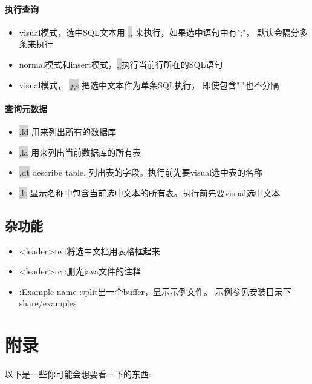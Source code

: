 \documentclass[oneside,openany]{book}
\begin{document}
\subsubsection{执行查询}

    \begin{itemize} 
      \item  visual模式，选中SQL文本用 \colorbox{lightgray}{,,} 来执行，如果选中语句中有";"， 默认会隔分多条来执行
      \item  normal模式和insert模式，\colorbox{lightgray}{,,}执行当前行所在的SQL语句
      \item  visual模式， \colorbox{lightgray}{,gs} 把选中文本作为单条SQL执行， 即使包含";"也不分隔
    \end{itemize} 

\subsubsection{查询元数据}

    \begin{itemize} 
    \item \colorbox{lightgray}{,ld} 用来列出所有的数据库
    \item \colorbox{lightgray}{,la} 用来列出当前数据库的所有表
    \item \colorbox{lightgray}{,dt} describe table, 列出表的字段。执行前先要visual选中表的名称
    \item \colorbox{lightgray}{,lt} 显示名称中包含当前选中文本的所有表。执行前先要visual选中文本
    \end{itemize} 

\section{杂功能}
  \begin{itemize}
        \item <leader>te  :将选中文档用表格框起来
        \item <leader>rc  :删光java文件的注释
        \item :Example name  :split出一个buffer，显示示例文件。 示例参见安装目录下share/examples
  \end{itemize}
    

\chapter{附录}
  以下是一些你可能会想要看一下的东西:
  \newline
\end{document}
